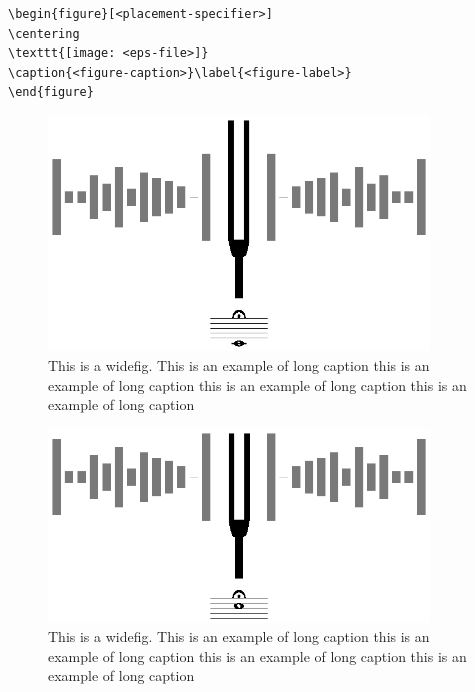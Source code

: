 \documentclass[sn-mathphys]{sn-jnl}%
\begin{document}
\bigskip
\begin{verbatim}
\begin{figure}[<placement-specifier>]
\centering
\texttt{[image: <eps-file>]}
\caption{<figure-caption>}\label{<figure-label>}
\end{figure}
\end{verbatim}
\bigskip

\begin{figure}[h]%
\centering
\includegraphics[width=0.9\textwidth]{tonicField.eps}
\caption{This is a widefig. This is an example of long caption this is an example of long caption  this is an example of long caption this is an example of long caption}\label{tonicFieldFig}
\end{figure}

\begin{figure}[h]%
\centering
\includegraphics[width=0.9\textwidth]{octaveField.eps}
\caption{This is a widefig. This is an example of long caption this is an example of long caption  this is an example of long caption this is an example of long caption}\label{octaveFieldFig}
\end{figure}
\end{document}
